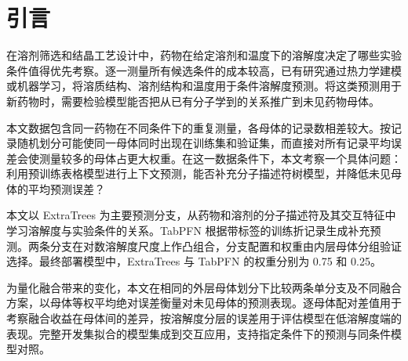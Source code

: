 \section{引言}
在溶剂筛选和结晶工艺设计中，药物在给定溶剂和温度下的溶解度决定了哪些实验条件值得优先考察。逐一测量所有候选条件的成本较高，已有研究通过热力学建模或机器学习，将溶质结构、溶剂结构和温度用于条件溶解度预测\cite{vermeire2022,fastsolv2025}。将这类预测用于新药物时，需要检验模型能否把从已有分子学到的关系推广到未见药物母体。

本文数据包含同一药物在不同条件下的重复测量，各母体的记录数相差较大。按记录随机划分可能使同一母体同时出现在训练集和验证集，而直接对所有记录平均误差会使测量较多的母体占更大权重\cite{leakage2023}。在这一数据条件下，本文考察一个具体问题：利用预训练表格模型进行上下文预测，能否补充分子描述符树模型，并降低未见母体的平均预测误差？

本文以 ExtraTrees 为主要预测分支，从药物和溶剂的分子描述符及其交互特征中学习溶解度与实验条件的关系。TabPFN 根据带标签的训练折记录生成补充预测。两条分支在对数溶解度尺度上作凸组合，分支配置和权重由内层母体分组验证选择。最终部署模型中，ExtraTrees 与 TabPFN 的权重分别为 0.75 和 0.25。

为量化融合带来的变化，本文在相同的外层母体划分下比较两条单分支及不同融合方案，以母体等权平均绝对误差衡量对未见母体的预测表现。逐母体配对差值用于考察融合收益在母体间的差异，按溶解度分层的误差用于评估模型在低溶解度端的表现。完整开发集拟合的模型集成到交互应用，支持指定条件下的预测与同条件模型对照。

